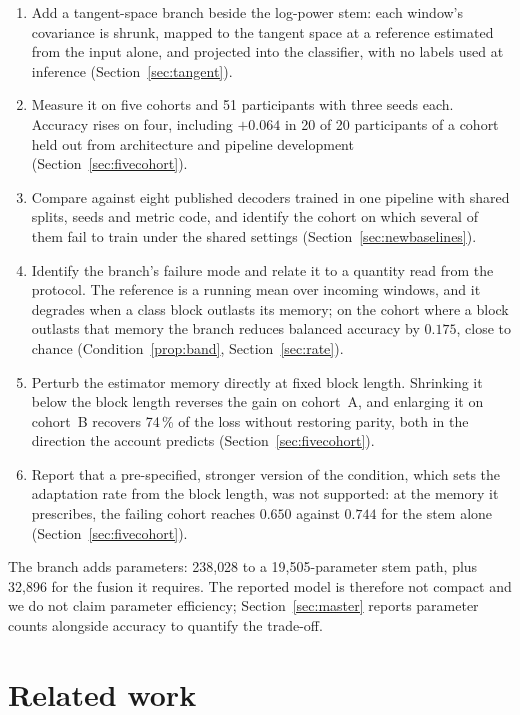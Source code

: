 \documentclass[a4paper,fleqn]{cas-dc}
\begin{document}
\begin{enumerate}
\item Add a tangent-space branch beside the log-power stem: each window's covariance is shrunk, mapped to the tangent space at a reference estimated from the input alone, and projected into the classifier, with no labels used at inference (Section~\ref{sec:tangent}).
\item Measure it on five cohorts and 51 participants with three seeds each. Accuracy rises on four, including $+0.064$ in 20 of 20 participants of a cohort held out from architecture and pipeline development (Section~\ref{sec:fivecohort}).
\item Compare against eight published decoders trained in one pipeline with shared splits, seeds and metric code, and identify the cohort on which several of them fail to train under the shared settings (Section~\ref{sec:newbaselines}).
\item Identify the branch's failure mode and relate it to a quantity read from the protocol. The reference is a running mean over incoming windows, and it degrades when a class block outlasts its memory; on the cohort where a block outlasts that memory the branch reduces balanced accuracy by $0.175$, close to chance (Condition~\ref{prop:band}, Section~\ref{sec:rate}).
\item Perturb the estimator memory directly at fixed block length. Shrinking it below the block length reverses the gain on cohort~A, and enlarging it on cohort~B recovers 74\,\% of the loss without restoring parity, both in the direction the account predicts (Section~\ref{sec:fivecohort}).
\item Report that a pre-specified, stronger version of the condition, which sets the adaptation rate from the block length, was not supported: at the memory it prescribes, the failing cohort reaches $0.650$ against $0.744$ for the stem alone (Section~\ref{sec:fivecohort}).
\end{enumerate}

The branch adds parameters: 238{,}028 to a 19{,}505-parameter stem path, plus 32{,}896 for the fusion it requires. The reported model is therefore not compact and we do not claim parameter efficiency; Section~\ref{sec:master} reports parameter counts alongside accuracy to quantify the trade-off.

\section{Related work}
\end{document}
